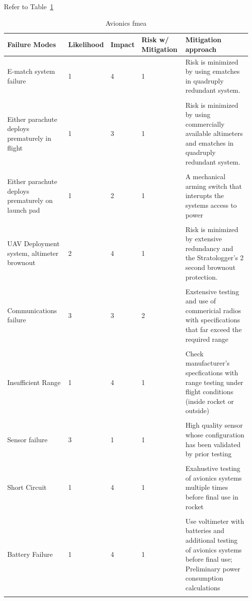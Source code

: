 Refer to Table~\ref{tab:Avionics:FMEA}
\begin{table}[htbp]
    \centering
    \caption{Avionics \gls{fmea}}
    \begin{tabularx}{\linewidth}{X l l l X}
        \toprule
        \textbf{Failure Modes} & \textbf{Likelihood} & \textbf{Impact} & \textbf{Risk w/ Mitigation} & \textbf{Mitigation approach} \\
        \midrule
        E-match system failure & 1     & 4     & 1     & Risk is minimized by using ematches in quadruply redundant system. \\\\
        Either parachute deploys prematurely in flight & 1     & 3     & 1     & Risk is minimized by using commercially available altimeters and ematches in quadruply redundant system. \\\\
        Either parachute deploys prematurely on launch pad & 1     & 2     & 1     & A mechanical arming switch that interupts the systems access to power  \\\\
        UAV Deployment system, altimeter brownout & 2     & 4     & 1     & Risk is minimized by extensive redundancy and the Stratologger's 2 second brownout protection. \\\\
        Communications failure & 3     & 3     & 2     & Exstensive testing and use of commericial radios with specifications that far exceed the required range \\\\
        Insufficient Range & 1     & 4     & 1     & Check manufacturer's specfications with range testing under flight conditions (inside rocket or outside) \\\\
        Sensor failure & 3     & 1     & 1     & High quality sensor whose configuration has been validated by prior testing \\ \\
        Short Circuit & 1     & 4     & 1     & Exahustive testing of avionics systems multiple times before final use in rocket \\\\
        Battery Failure & 1     & 4     & 1     & Use voltimeter with batteries and additional testing of avionics systems before final use; Preliminary power consumption calculations \\\\
        \bottomrule
    \end{tabularx}%
    \label{tab:Avionics:FMEA}%
  \end{table}%

